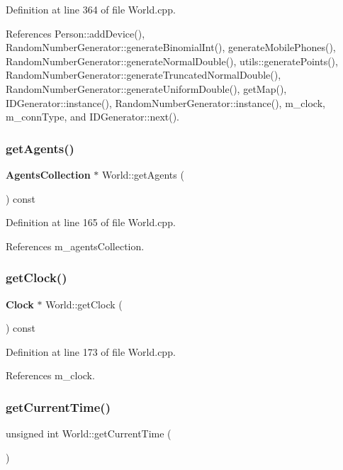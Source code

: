 Definition at line 364 of file World.\+cpp.



References Person\+::add\+Device(), Random\+Number\+Generator\+::generate\+Binomial\+Int(), generate\+Mobile\+Phones(), Random\+Number\+Generator\+::generate\+Normal\+Double(), utils\+::generate\+Points(), Random\+Number\+Generator\+::generate\+Truncated\+Normal\+Double(), Random\+Number\+Generator\+::generate\+Uniform\+Double(), get\+Map(), I\+D\+Generator\+::instance(), Random\+Number\+Generator\+::instance(), m\+\_\+clock, m\+\_\+conn\+Type, and I\+D\+Generator\+::next().

\mbox{\label{class_world_a365cced3803fd8390a781619b61e2818}} 
\subsubsection{getAgents()}
{\footnotesize\ttfamily \textbf{ Agents\+Collection} $\ast$ World\+::get\+Agents (\begin{DoxyParamCaption}{ }\end{DoxyParamCaption}) const}



Definition at line 165 of file World.\+cpp.



References m\+\_\+agents\+Collection.

\mbox{\label{class_world_a521915088db371c5730093331a74b080}} 
\subsubsection{getClock()}
{\footnotesize\ttfamily \textbf{ Clock} $\ast$ World\+::get\+Clock (\begin{DoxyParamCaption}{ }\end{DoxyParamCaption}) const}



Definition at line 173 of file World.\+cpp.



References m\+\_\+clock.

\mbox{\label{class_world_af33b51dff9edc6770890ef579700d959}} 
\subsubsection{getCurrentTime()}
{\footnotesize\ttfamily unsigned int World\+::get\+Current\+Time (\begin{DoxyParamCaption}{ }\end{DoxyParamCaption})}



